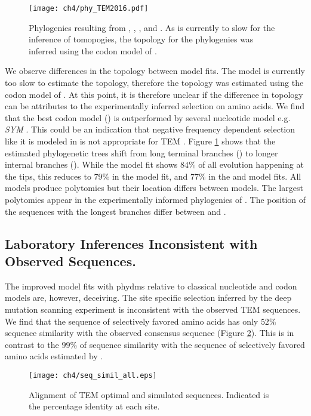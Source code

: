 \begin{figure}[H]
     \centering
	\texttt{[image: ch4/phy\_TEM2016.pdf]}
	\caption{Phylogenies resulting from \selac, \selacDMS, \phydms, and \gy. As \selac is currently to slow for the inference of tomopogies, the topology for the \selac phylogenies was inferred using the codon model of \citet{KosiolEtAl07}.}
	\label{fig:phylo}
\end{figure}

We observe differences in the topology between model fits.
The \selac model is currently too slow to estimate the topology, therefore the topology was estimated using the codon model of \citet{KosiolEtAl07}.
At this point, it is therefore unclear if the difference in topology can be attributes to the experimentally inferred selection on amino acids.
We find that the best codon model (\gy) \citep{GoldmanAndYang1994} is outperformed by several nucleotide model e.g. \emph{SYM} \citep{zharkikh1994}.
This could be an indication that negative frequency dependent selection like it is modeled in \gy is not appropriate for TEM \citep{GoldmanAndYang1994,beaulieu2018}.
Figure \ref{fig:phylo} shows that the estimated phylogenetic trees shift from long terminal branches (\selac) to longer internal branches (\phydms).
While the \selac model fit shows $84 \%$ of all evolution happening at the tips, this reduces to $79 \%$ in the \selacDMS model fit, and $77 \%$ in the \phydms and \gy model fits.
All models produce polytomies but their location differs between models.
The largest polytomies appear in the experimentally informed phylogenies of \phydms.
The position of the sequences with the longest branches differ between \selac and \phydms.


\subsection{Laboratory Inferences Inconsistent with Observed Sequences.}
The improved model fits with phydms relative to classical nucleotide and codon models are, however, deceiving.
The site specific selection inferred by the deep mutation scanning experiment is inconsistent with the observed TEM sequences.
We find that the sequence of selectively favored amino acids has only $52 \%$ sequence similarity with the observed consensus sequence (Figure \ref{fig:sim_seqs_cons}).
This is in contrast to the $99 \%$ of sequence similarity with the sequence of selectively favored amino acids estimated by \selac.

\begin{figure}[H]
     \centering
	\texttt{[image: ch4/seq\_simil\_all.eps]}
	\caption{Alignment of TEM optimal and simulated sequences. Indicated is the percentage identity at each site.}
	\label{fig:sim_seqs_cons}
\end{figure}

